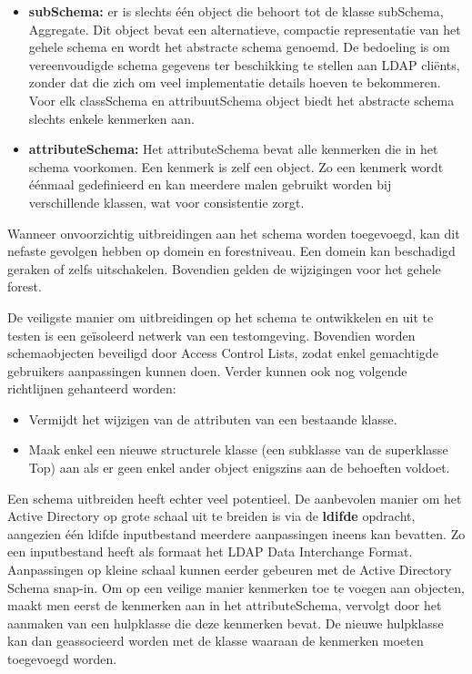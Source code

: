 \begin{enumerate}
		{ 
			\begin{itemize}
				\item \textbf{subSchema:} er is slechts één object die behoort tot de klasse subSchema, Aggregate. Dit object bevat een alternatieve, compactie representatie van het gehele schema en wordt het abstracte schema genoemd. De bedoeling is om vereenvoudigde schema gegevens ter beschikking te stellen aan LDAP cliënts, zonder dat die zich om veel implementatie details hoeven te bekommeren. Voor elk classSchema en attribuutSchema object biedt het abstracte schema slechts enkele kenmerken aan. 
				\item \textbf{attributeSchema:} Het attributeSchema bevat alle kenmerken die in het schema voorkomen. Een kenmerk is zelf een object. Zo een kenmerk wordt éénmaal gedefinieerd en kan meerdere malen gebruikt worden bij verschillende klassen, wat voor consistentie zorgt.
			\end{itemize}
		}
		
		 { 
			 Wanneer onvoorzichtig uitbreidingen aan het schema worden toegevoegd, kan dit nefaste gevolgen hebben op domein en forestniveau. Een domein kan beschadigd geraken of zelfs uitschakelen. Bovendien gelden de wijzigingen voor het gehele forest.
				
				De veiligste manier om uitbreidingen op het schema te ontwikkelen en uit te testen is een geïsoleerd netwerk van een testomgeving. Bovendien worden schemaobjecten beveiligd door Access Control Lists, zodat enkel gemachtigde gebruikers aanpassingen kunnen doen. Verder kunnen ook nog volgende richtlijnen gehanteerd worden:
				\begin{itemize}
					\item Vermijdt het wijzigen van de attributen van een bestaande klasse.
					\item Maak enkel een nieuwe structurele klasse (een subklasse van de superklasse Top) aan als er geen enkel ander object enigszins aan de behoeften voldoet.
				\end{itemize}
				
				Een schema uitbreiden heeft echter veel potentieel. De aanbevolen manier om het Active Directory op grote schaal uit te breiden is via de \textbf{ldifde} opdracht, aangezien één ldifde inputbestand meerdere aanpassingen ineens kan bevatten. Zo een inputbestand heeft als formaat het LDAP Data Interchange Format. Aanpassingen op kleine schaal kunnen eerder gebeuren met de Active Directory Schema snap-in. Om op een veilige manier kenmerken toe te voegen aan objecten, maakt men eerst de kenmerken aan in het attributeSchema, vervolgt door het aanmaken van een hulpklasse die deze kenmerken bevat. De nieuwe hulpklasse kan dan geassocieerd worden met de klasse waaraan de kenmerken moeten toegevoegd worden.
		
		}
	\end{enumerate}
	
